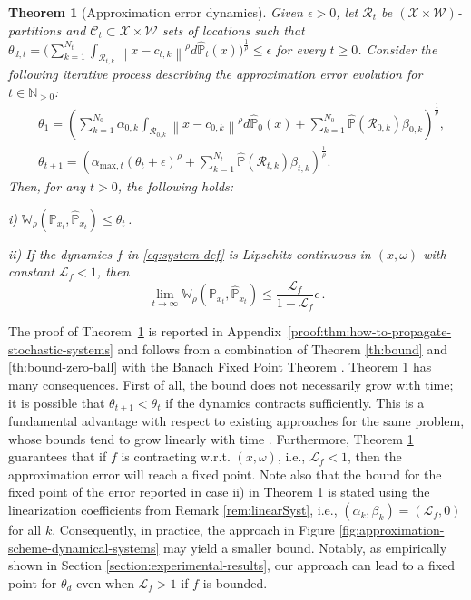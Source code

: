 \documentclass[11pt, a4paper, oneside,reqno]{amsart}
\theoremstyle{plain}
\newtheorem{theorem}{Theorem}[section] %
\def\prob{\mathbb{P}}
\def\probHat{\hat{\mathbb{P}}}
\def\wasserstein{{\mathbb{W}}}
\newcommand{\norm}[1]{\left\lVert#1\right\rVert}
\def\lipschitz{{\mathcal{L}}}
\def\sL{{\mathcal{L}}}
\def\sR{{\mathcal{R}}}
\def\sW{{\mathcal{W}}}
\def\sX{{\mathcal{X}}}
\def\bsR{{\bm{\mathcal{R}}}}
\def\bsC{{\bm{\mathcal{C}}}}
\begin{document}
\begin{theorem}[Approximation error dynamics]\label{thm:how-to-propagate-stochastic-systems}
Given $\epsilon>0$, let $\bsR_t$ be $(\sX \times \sW)$-partitions and $\bsC_t \subset \sX \times \sW$ sets of locations such that $\theta_{d,t} = \bigg( \sum_{k=1}^{N_t} \int_{\sR_{t, k}} \norm{x-c_{t, k}}^\rho d\probHat_t(x) \bigg)^\frac{1}{\rho} \leq \epsilon$ for every $t \geq 0 $. Consider the following iterative process describing the approximation error evolution for $t\in \mathbb{N}_{>0}$:
\begin{align*}
    & \theta_1 = {\left( \sum_{k=1}^{N_0} \alpha_{0, k} \int_{\sR_{0, k}} \norm{x-c_{0, k}}^\rho d\probHat_0(x) + \sum_{k=1}^{N_0} \probHat(\sR_{0, k})\beta_{0,k} \right)^\frac{1}{\rho} }, \\
    & \theta_{t+1} = \left(\alpha_{\text{max},t}( \theta_t + \epsilon )^\rho + \sum_{k=1}^{N_t} \probHat(\sR_{t, k}) \beta_{t, k} \right)^\frac{1}{\rho}.
\end{align*}
Then, for any $t>0$, the following holds:

i) $\wasserstein_\rho(\prob_{x_{t}}, \probHat_{x_{t}}) \leq \theta_t \,$.

ii) If the dynamics $f$ in \eqref{eq:system-def} is Lipschitz continuous in $(x, \omega)$ with constant $\sL_f <1$, then
$$ \lim_{t \to \infty} \wasserstein_\rho(\prob_{x_{t}}, \probHat_{x_{t}}) \leq   \frac{\sL_f}{1- \sL_f }\epsilon \,.$$
\end{theorem}
The proof of Theorem~\ref{thm:how-to-propagate-stochastic-systems} is reported in Appendix~\ref{proof:thm:how-to-propagate-stochastic-systems} and follows from a combination of Theorem \ref{th:bound} and \ref{th:bound-zero-ball} with the Banach Fixed Point Theorem \cite{goebel1990topics}.
Theorem \ref{thm:how-to-propagate-stochastic-systems} has many consequences. First of all, the bound does not necessarily grow with time; it is possible that $\theta_{t+1}<\theta_t$ if the dynamics contracts sufficiently. This is a fundamental advantage with respect to existing approaches for the same problem, whose bounds tend to grow linearly with time \cite{figueiredo2024uncertainty}. 
Furthermore, Theorem \ref{thm:how-to-propagate-stochastic-systems} guarantees that if $f$ is contracting w.r.t. $(x,\omega)$, i.e., $\lipschitz_f<1$, then the approximation error will reach a fixed point. 
Note also that the bound for the fixed point of the error reported in case ii) in Theorem \ref{thm:how-to-propagate-stochastic-systems} is stated using 
the linearization coefficients from Remark \ref{rem:linearSyst}, i.e., \((\alpha_k,\beta_k)=(\lipschitz_f, 0)\) for all \(k\). 
Consequently, in practice, the approach in Figure \ref{fig:approximation-scheme-dynamical-systems} may yield a smaller bound. 
Notably, as empirically shown in Section \ref{section:experimental-results}, our approach can lead to a fixed point for $\theta_d$ even when $\sL_f>1$ if $f$ is bounded.
\end{document}
